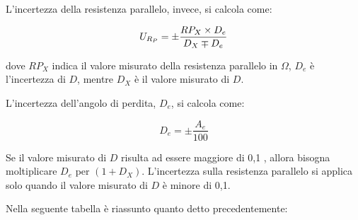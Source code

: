 \begin{table}[H]
\centering
{}
\caption{Tabella di incertezza fornita dal costruttore, con Uz l'incertezza}
\label{tab:lcr_c_sheet}
\end{table}
\FloatBarrier

L’incertezza della resistenza parallelo, invece, si calcola come:

\begin{equation}
        U_{R_P} = \pm \frac{RP_X \times D_e}{D_X \mp D_e}  \\
\end{equation}

dove $RP_X$ indica il valore misurato della resistenza parallelo in $\Omega$, $D_e$ è l’incertezza di 
$D$, mentre $D_X$ è il valore misurato di $D$.

L’incertezza dell’angolo di perdita, $D_e$, si calcola come:

\begin{equation}
    D_e = \pm \frac{A_e}{100}
\end{equation}

Se il valore misurato di $D$ risulta ad essere maggiore di 0,1 , allora bisogna 
moltiplicare $D_e$ per $(1+D_X)$. L’incertezza sulla resistenza parallelo si applica solo 
quando il valore misurato di $D$ è minore di 0,1.

Nella seguente tabella è riassunto quanto detto precedentemente:

